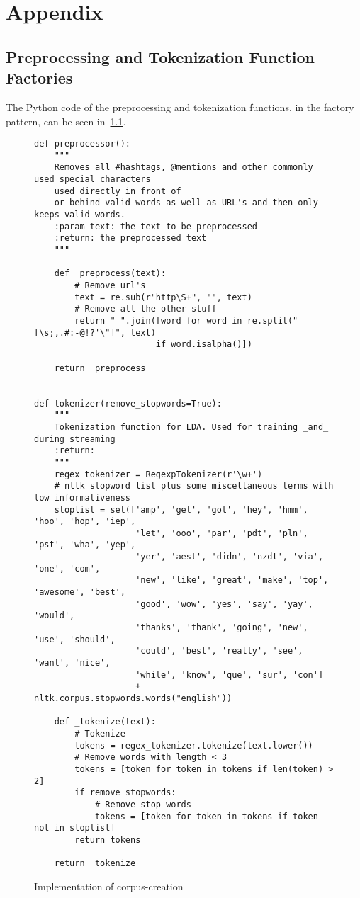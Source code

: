 \chapter{Appendix}
\label{ch:appendix}

\section{Preprocessing and Tokenization Function Factories}
\label{sec:preprocessingAndTokenizationFunctionFactories}
The Python code of the preprocessing and tokenization functions,
in the factory pattern, can be seen in~\cref{code:preprocessing_tokenization}.

\begin{figure}
    \caption{Implementation of corpus-creation}
    \label{code:preprocessing_tokenization}
    \begin{verbatim}
def preprocessor():
    """
    Removes all #hashtags, @mentions and other commonly used special characters
    used directly in front of
    or behind valid words as well as URL's and then only keeps valid words.
    :param text: the text to be preprocessed
    :return: the preprocessed text
    """

    def _preprocess(text):
        # Remove url's
        text = re.sub(r"http\S+", "", text)
        # Remove all the other stuff
        return " ".join([word for word in re.split("[\s;,.#:-@!?'\"]", text)
                        if word.isalpha()])

    return _preprocess


def tokenizer(remove_stopwords=True):
    """
    Tokenization function for LDA. Used for training _and_ during streaming
    :return:
    """
    regex_tokenizer = RegexpTokenizer(r'\w+')
    # nltk stopword list plus some miscellaneous terms with low informativeness
    stoplist = set(['amp', 'get', 'got', 'hey', 'hmm', 'hoo', 'hop', 'iep',
                    'let', 'ooo', 'par', 'pdt', 'pln', 'pst', 'wha', 'yep',
                    'yer', 'aest', 'didn', 'nzdt', 'via', 'one', 'com',
                    'new', 'like', 'great', 'make', 'top', 'awesome', 'best',
                    'good', 'wow', 'yes', 'say', 'yay', 'would',
                    'thanks', 'thank', 'going', 'new', 'use', 'should',
                    'could', 'best', 'really', 'see', 'want', 'nice',
                    'while', 'know', 'que', 'sur', 'con']
                    + nltk.corpus.stopwords.words("english"))

    def _tokenize(text):
        # Tokenize
        tokens = regex_tokenizer.tokenize(text.lower())
        # Remove words with length < 3
        tokens = [token for token in tokens if len(token) > 2]
        if remove_stopwords:
            # Remove stop words
            tokens = [token for token in tokens if token not in stoplist]
        return tokens

    return _tokenize
    \end{verbatim}
\end{figure}

\newpage
